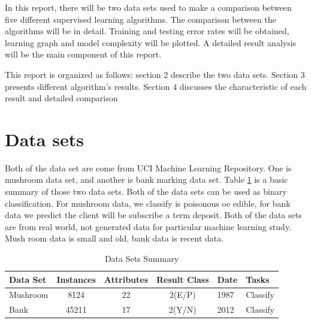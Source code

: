 \documentclass[10pt, conference, compsocconf]{IEEEtran}
\begin{document}
In this report, there will be two data sets used to make a comparison between five different supervised learning algorithms. The comparison between the algorithms will be in detail. Training and testing error rates will be obtained, learning graph and model complexity will be plotted. A detailed result analysis will be the main component of this report. 

This report is organized as follows: section 2 describe the two data sets. Section 3 presents different algorithm's results. Section 4 discusses the characteristic of each result and detailed comparison 

\section{Data sets}
Both of the data set are come from UCI Machine Learning Repository. One is mushroom data set\cite{Mushroom}, and another is bank marking data set\cite{bank}. Table \ref{tab:1} is a basic summary of those two data sets. Both of the data sets can be used as binary classification. For mushroom data, we classify is poisonous oe edible, for bank data we predict the client will be subscribe a term deposit. Both of the data sets are from real world, not generated data for particular machine learning study. Mush room data is small and old, bank data is recent data.

\begin{table}[h]
	\centering
	\caption{Data Sets Summary}
	\label{tab:1}
	\begin{tabular}{|l|c|c|c|l|l|}
		\hline
		Data Set & \multicolumn{1}{l|}{Instances} & \multicolumn{1}{l|}{Attributes} & \multicolumn{1}{l|}{Result Class} & Date & Tasks          \\ \hline
		Mushroom & 8124                           & 22                              & 2(E/P)                            & 1987 & Classify \\ \hline
		Bank     & 45211                          & 17                              & 2(Y/N)                            & 2012 & Classify \\ \hline
	\end{tabular}
\end{table}
\end{document}
